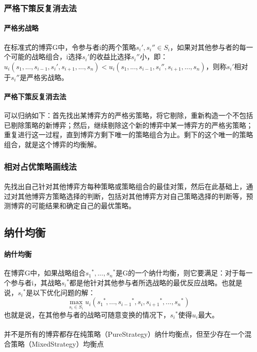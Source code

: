 \documentclass[12pt,a4paper]{article}
\begin{document}
\subsubsection{严格下策反复消去法}
\paragraph{严格劣战略} 在标准式的博弈G中，令参与者i的两个策略${s_i}',{s_i}'' \in S_i$，如果对其他参与者的每一个可能的战略组合，i选择${s_i}'$的收益比选择${s_i}''$小，即：$u_i(s_1,...,s_{i-1},{s_i}',s_{i+1},...,s_n) < u_i(s_1,...,s_{i-1},{s_i}'',s_{i+1},...,s_n)$，则称${s_i}'$相对于${s_i}''$是严格劣战略。
\paragraph{严格下策反复消去法} 可以归纳如下：首先找出某博弈方的严格劣策略，将它剔除，重新构造一个不包括已剔除策略的新博弈；然后，继续剔除这个新的博弈中某一博弈方的严格劣策略；重复进行这一过程，直到博弈方剩下唯一的策略组合为止。剩下的这个唯一的策略组合，就是这个博弈的均衡解。

\subsubsection{相对占优策略画线法}
\paragraph{} 先找出自己针对其他博弈方每种策略或策略组合的最佳对策，然后在此基础上，通过对其他博弈方策略选择的判断，包括对其他博弈方对自己策略选择的判断等，预测博弈的可能结果和确定自己的最优策略。

\subsection{纳什均衡}

\paragraph{纳什均衡} 在博弈G中，如果战略组合${s_1}^*,...,{s_n}^*$是G的一个纳什均衡，则它要满足：对于每一个参与者i，其战略${s_i}^*$都是他针对其他参与者所选战略的最优反应战略。也就是说，${s_i}^*$是以下优化问题的解：
	\begin{equation}
		\max_{s_i \in S_i} u_i({s_1}^*,...,{s_{i-1}}^*,s_i,{s_{i+1}}^*,...,{s_n}^*)
	\end{equation}
也就是说，在其他参与者的战略可随意变换的情况下，${s_i}^*$使得$u_i$最大。
\paragraph{} 并不是所有的博弈都存在纯策略（PureStrategy）纳什均衡点，但至少存在一个混合策略（MixedStrategy）均衡点
\end{document}
